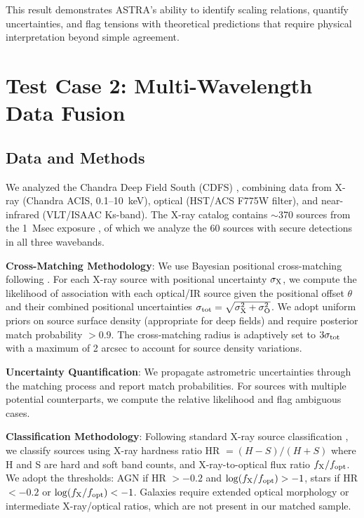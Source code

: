 \documentclass[usenatbib]{rasti}
\begin{document}
This result demonstrates ASTRA's ability to identify scaling relations, quantify uncertainties, and flag tensions with theoretical predictions that require physical interpretation beyond simple agreement.

\section{Test Case 2: Multi-Wavelength Data Fusion}

\subsection{Data and Methods}

We analyzed the Chandra Deep Field South (CDFS) \cite{giacconi2001}, combining data from X-ray (Chandra ACIS, 0.1--10~keV), optical (HST/ACS F775W filter), and near-infrared (VLT/ISAAC Ks-band). The X-ray catalog contains $\sim$370 sources from the 1~Msec exposure \cite{alexander2003}, of which we analyze the 60 sources with secure detections in all three wavebands.

\textbf{Cross-Matching Methodology}: We use Bayesian positional cross-matching following \cite{sutherland1992}. For each X-ray source with positional uncertainty $\sigma_{\rm X}$, we compute the likelihood of association with each optical/IR source given the positional offset $\theta$ and their combined positional uncertainties $\sigma_{\rm tot} = \sqrt{\sigma_{\rm X}^2 + \sigma_{\rm O}^2}$. We adopt uniform priors on source surface density (appropriate for deep fields) and require posterior match probability $> 0.9$. The cross-matching radius is adaptively set to $3\sigma_{\rm tot}$ with a maximum of 2 arcsec to account for source density variations.

\textbf{Uncertainty Quantification}: We propagate astrometric uncertainties through the matching process and report match probabilities. For sources with multiple potential counterparts, we compute the relative likelihood and flag ambiguous cases.

\textbf{Classification Methodology}: Following standard X-ray source classification \cite{hornschemeier2001,bauer2004}, we classify sources using X-ray hardness ratio HR $= (H-S)/(H+S)$ where H and S are hard and soft band counts, and X-ray-to-optical flux ratio $f_{\rm X}/f_{\rm opt}$. We adopt the thresholds: AGN if HR $> -0.2$ and $\log(f_{\rm X}/f_{\rm opt}) > -1$, stars if HR $< -0.2$ or $\log(f_{\rm X}/f_{\rm opt}) < -1$. Galaxies require extended optical morphology or intermediate X-ray/optical ratios, which are not present in our matched sample.
\end{document}
